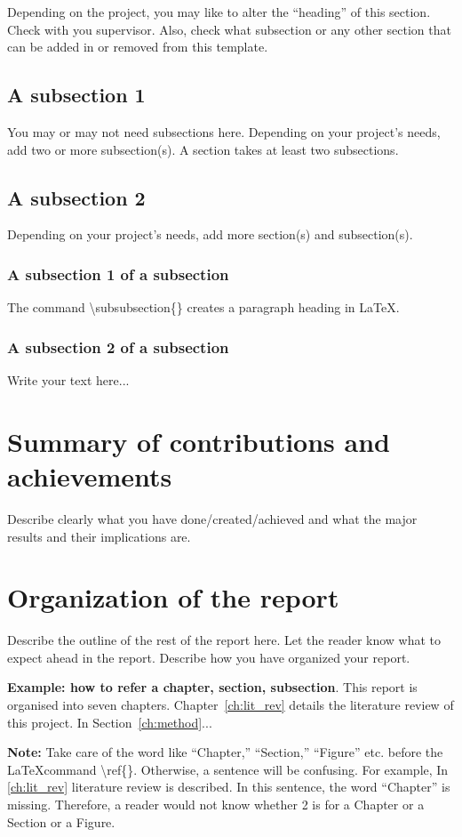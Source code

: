Depending on the project, you may like to alter the ``heading'' of this section. Check with you supervisor. Also, check what subsection or any other section that can be added in or removed from this template.

\subsection{A subsection 1}
\label{sec:intro_some_sub1}
You may or may not need subsections here. Depending on your project's needs, add two or more subsection(s). A section takes at least two subsections. 

\subsection{A subsection 2}
\label{sec:intro_some_sub2}
Depending on your project's needs, add more section(s) and subsection(s).

\subsubsection{A subsection 1 of a subsection}
\label{sec:intro_some_subsub1}
The command \textbackslash subsubsection\{\} creates a paragraph heading in \LaTeX.

\subsubsection{A subsection 2 of a subsection}
\label{sec:intro_some_subsub2}
Write your text here...

\section{Summary of contributions and achievements} %
\label{sec:intro_sum_results} %
Describe clearly what you have done/created/achieved and what the major results and their implications are. 


\section{Organization of the report} %
\label{sec:intro_org} %
Describe the outline of the rest of the report here. Let the reader know what to expect ahead in the report. Describe how you have organized your report. 

\textbf{Example: how to refer a chapter, section, subsection}. This report is organised into seven chapters. Chapter~\ref{ch:lit_rev} details the literature review of this project. In Section~\ref{ch:method}...  %

\textbf{Note:}  Take care of the word like ``Chapter,'' ``Section,'' ``Figure'' etc. before the \LaTeX command \textbackslash ref\{\}. Otherwise, a  sentence will be confusing. For example, In \ref{ch:lit_rev} literature review is described. In this sentence, the word ``Chapter'' is missing. Therefore, a reader would not know whether 2 is for a Chapter or a Section or a Figure.